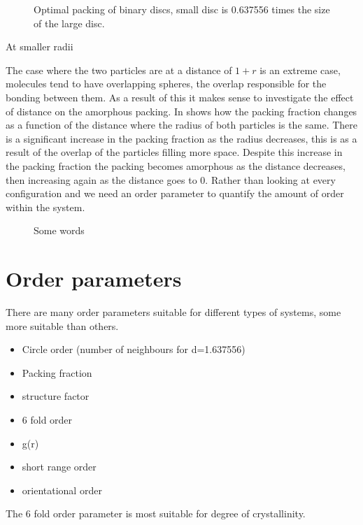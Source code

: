 \begin{figure}
    \caption{Optimal packing of binary discs, small disc is 0.637556 times the size of the large disc.}
    \label{crys:d=1.637556}
\end{figure}

At smaller radii 

The case where the two particles are at a distance of $1+r$ is an extreme case, molecules tend to have overlapping spheres, the overlap responsible for the bonding between them. As a result of this it makes sense to investigate the effect of distance on the amorphous packing. In  shows how the packing fraction changes as a function of the distance where the radius of both particles is the same. There is a significant increase in the packing fraction as the radius decreases, this is as a result of the overlap of the particles filling more space. Despite this increase in the packing fraction the packing becomes amorphous as the distance decreases, then increasing again as the distance goes to 0. Rather than looking at every configuration and we need an order parameter to quantify the amount of order within the system.

\begin{figure}
    \label{fig:var d fix r}
    \caption{Some words}
\end{figure}

\section{Order parameters}

There are many order parameters suitable for different types of systems, some more suitable than others.
\begin{itemize}
    \item Circle order (number of neighbours for d=1.637556)
    \item Packing fraction
    \item structure factor
    \item 6 fold order
    \item g(r)
    \item short range order
    \item orientational order
\end{itemize}
The 6 fold order parameter is most suitable for degree of crystallinity.

